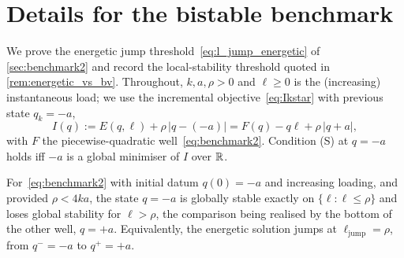 \section{Details for the bistable benchmark}
\label{app:experiments}

We prove the energetic jump threshold~\eqref{eq:l_jump_energetic} of
\cref{sec:benchmark2} and record the local-stability threshold quoted in
\cref{rem:energetic_vs_bv}. Throughout, $k,a,\rho>0$ and $\ell\ge0$ is
the (increasing) instantaneous load; we use the incremental
objective~\eqref{eq:Ikstar} with previous state $q_k=-a$,
\begin{equation}\label{eq:I_bistable}
  I(q):=E(q,\ell)+\rho\,|q-(-a)|=F(q)-q\ell+\rho\,|q+a|,
\end{equation}
with $F$ the piecewise-quadratic well~\eqref{eq:benchmark2}. Condition
(S) at $q=-a$ holds iff $-a$ is a global minimiser of $I$ over $\mathbb{R}$.

\begin{proposition}\label{prop:jump_energetic}
For~\eqref{eq:benchmark2} with initial datum $q(0)=-a$ and increasing
loading, and provided $\rho<4ka$, the state $q=-a$ is globally stable
exactly on $\{\ell:\ell\le\rho\}$ and loses global stability for
$\ell>\rho$, the comparison being realised by the bottom of the other
well, $q=+a$. Equivalently, the energetic solution jumps at
$\ell_{\mathrm{jump}}=\rho$, from $q^-=-a$ to $q^+=+a$.
\end{proposition}

